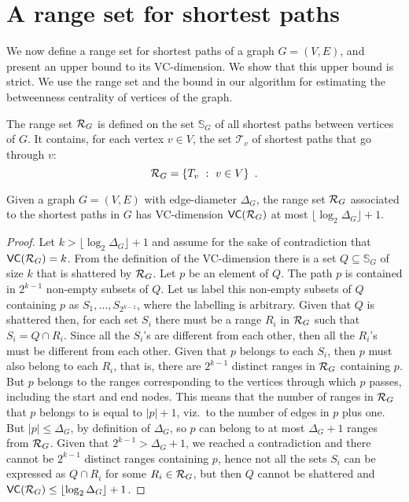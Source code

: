 \section{A range set for shortest paths}\label{sec:rangeset}
We now define a range set for shortest paths of a graph $G=(V,E)$, and present 
an upper bound to its VC-dimension. We show that this upper bound is strict. We
use the range set and the bound in our algorithm for estimating the betweenness
centrality of vertices of the graph.

The range set $\mathcal{R}_G$ is defined on the set $\mathbb{S}_G$ of all shortest
paths between vertices of $G$. It contains, for each vertex $v\in V$, the set
$\mathcal{T}_v$  of shortest paths that go through $v$:
\[
\mathcal{R}_G = \{T_v ~:~ v\in V\}\enspace.
\]

\begin{lemma}\label{lem:vcdimuppbound}
  Given a graph $G=(V,E)$ with edge-diameter $\Delta_G$, the range set
  $\mathcal{R}_G$ associated to the shortest paths in $G$ has VC-dimension
  $\mathsf{VC}(\mathcal{R}_G)$ at most $\lfloor\log_2\Delta_G\rfloor+1$.
\end{lemma}

\begin{proof}
Let $k>\lfloor\log_2\Delta_G\rfloor+1$ and assume for the sake of contradiction
that $\mathsf{VC}(\mathcal{R}_G)=k$. From the definition of the VC-dimension there is a set
$Q\subseteq\mathbb{S}_G$ of size $k$ that is shattered by $\mathcal{R}_G$. Let $p$ be
an element of $Q$. The path $p$ is contained in $2^{k-1}$ non-empty subsets of
$Q$. Let us label this non-empty subsets of $Q$ containing $p$ as
$S_1,\dotsc,S_{2^{k-1}}$, where the labelling is arbitrary.
Given that $Q$ is shattered then, for each set $S_i$ there must be a range $R_i$ in
$\mathcal{R}_G$ such that $S_i=Q\cap R_i$. Since all the $S_i$'s are
different from each other, then all the $R_i$'s must be different from each
other. Given that $p$ belongs to each $S_i$, then $p$ must also belong to each
$R_i$, that is, there are $2^{k-1}$ distinct ranges in $\mathcal{R}_G$ containing
$p$. But $p$ belongs to the ranges corresponding to the vertices through which $p$
passes, including the start and end nodes. This means that the number of ranges
in $\mathcal{R}_G$ that $p$ belongs to is equal to $|p|+1$, viz.~to the number of
edges in $p$ plus one. But $|p|\le\Delta_G$, by definition of $\Delta_G$, so $p$
can belong to at most $\Delta_G+1$ ranges from $\mathcal{R}_G$. Given that
$2^{k-1}>\Delta_G+1$, we reached a contradiction and there cannot be $2^{k-1}$
distinct ranges containing $p$, hence not all the sets $S_i$ can be expressed as
$Q\cap R_i$ for some $R_i\in\mathcal{R}_G$, but then $Q$ cannot be shattered and
$\mathsf{VC}(\mathcal{R}_G)\le\lfloor\log_2\Delta_G\rfloor+1$.%
\end{proof}

